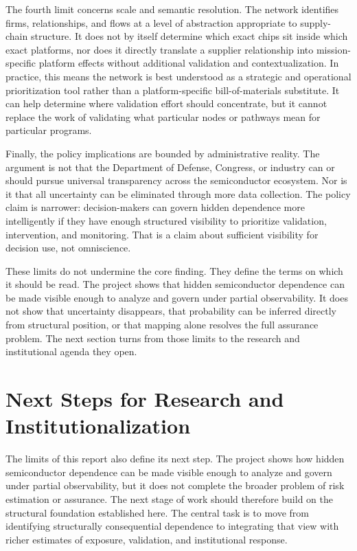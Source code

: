 The fourth limit concerns scale and semantic resolution. The network identifies firms, relationships, and flows at a level of abstraction appropriate to supply-chain structure. It does not by itself determine which exact chips sit inside which exact platforms, nor does it directly translate a supplier relationship into mission-specific platform effects without additional validation and contextualization. In practice, this means the network is best understood as a strategic and operational prioritization tool rather than a platform-specific bill-of-materials substitute. It can help determine where validation effort should concentrate, but it cannot replace the work of validating what particular nodes or pathways mean for particular programs.

Finally, the policy implications are bounded by administrative reality. The argument is not that the Department of Defense, Congress, or industry can or should pursue universal transparency across the semiconductor ecosystem. Nor is it that all uncertainty can be eliminated through more data collection. The policy claim is narrower: decision-makers can govern hidden dependence more intelligently if they have enough structured visibility to prioritize validation, intervention, and monitoring. That is a claim about sufficient visibility for decision use, not omniscience.

These limits do not undermine the core finding. They define the terms on which it should be read. The project shows that hidden semiconductor dependence can be made visible enough to analyze and govern under partial observability. It does not show that uncertainty disappears, that probability can be inferred directly from structural position, or that mapping alone resolves the full assurance problem. The next section turns from those limits to the research and institutional agenda they open.

\section{Next Steps for Research and Institutionalization}
\label{sec:ch6_next_steps_research_institutionalization}

The limits of this report also define its next step. The project shows how hidden semiconductor dependence can be made visible enough to analyze and govern under partial observability, but it does not complete the broader problem of risk estimation or assurance. The next stage of work should therefore build on the structural foundation established here. The central task is to move from identifying structurally consequential dependence to integrating that view with richer estimates of exposure, validation, and institutional response.

